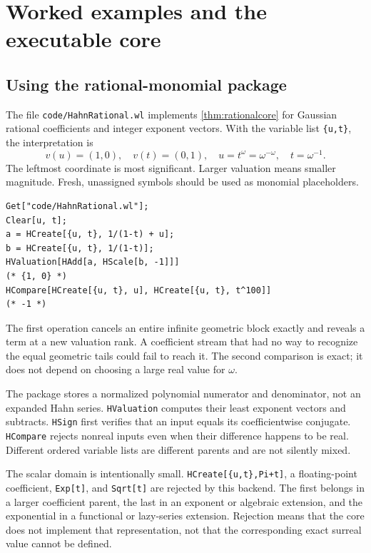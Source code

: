 \documentclass[11pt,letterpaper]{article}
\theoremstyle{definition}\newtheorem{definition}[theorem]{Definition}
\theoremstyle{remark}\newtheorem{remark}[theorem]{Remark}
\newcommand{\code}[1]{\texttt{#1}}
\numberwithin{equation}{section}\setcounter{tocdepth}{2}
\begin{document}
\section{Worked examples and the executable core}\label{sec:examples}
\subsection{Using the rational-monomial package}
The file \code{code/HahnRational.wl} implements \cref{thm:rationalcore} for Gaussian rational coefficients and integer exponent vectors. With the variable list \code{\{u,t\}}, the interpretation is
\[
 v(u)=(1,0),\quad v(t)=(0,1),\quad
 u=t^\omega=\omega^{-\omega},\quad t=\omega^{-1}.
\]
The leftmost coordinate is most significant. Larger valuation means smaller magnitude. Fresh, unassigned symbols should be used as monomial placeholders.

\par\noindent\begin{minipage}{\textwidth}
\begin{lstlisting}
Get["code/HahnRational.wl"];
Clear[u, t];
a = HCreate[{u, t}, 1/(1-t) + u];
b = HCreate[{u, t}, 1/(1-t)];
HValuation[HAdd[a, HScale[b, -1]]]
(* {1, 0} *)
HCompare[HCreate[{u, t}, u], HCreate[{u, t}, t^100]]
(* -1 *)
\end{lstlisting}
\end{minipage}\par
The first operation cancels an entire infinite geometric block exactly and reveals a term at a new valuation rank. A coefficient stream that had no way to recognize the equal geometric tails could fail to reach it. The second comparison is exact; it does not depend on choosing a large real value for $\omega$.

The package stores a normalized polynomial numerator and denominator, not an expanded Hahn series. \code{HValuation} computes their least exponent vectors and subtracts. \code{HSign} first verifies that an input equals its coefficientwise conjugate. \code{HCompare} rejects nonreal inputs even when their difference happens to be real. Different ordered variable lists are different parents and are not silently mixed.

The scalar domain is intentionally small. \code{HCreate[\{u,t\},Pi+t]}, a floating-point coefficient, \code{Exp[t]}, and \code{Sqrt[t]} are rejected by this backend. The first belongs in a larger coefficient parent, the last in an exponent or algebraic extension, and the exponential in a functional or lazy-series extension. Rejection means that the core does not implement that representation, not that the corresponding exact surreal value cannot be defined.
\end{document}
